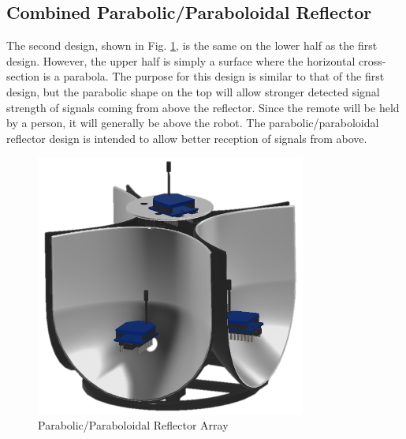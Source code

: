 \subsection{Combined Parabolic/Paraboloidal Reflector}
The second design, shown in Fig. \ref{fig:parabolicReflector}, is the same on the lower half as the first design. However, the upper half is simply a surface where the horizontal cross-section is a parabola. The purpose for this design is similar to that of the first design, but the parabolic shape on the top will allow stronger detected signal strength of signals coming from above the reflector. Since the remote will be held by a person, it will generally be above the robot. The parabolic/paraboloidal reflector design is intended to allow better reception of signals from above.
\begin{figure}
    \centering
    \includegraphics[width=3.5in]{figs/img/parabolicReflector.png}
    \caption{Parabolic/Paraboloidal Reflector Array}
    \label{fig:parabolicReflector}
\end{figure}

